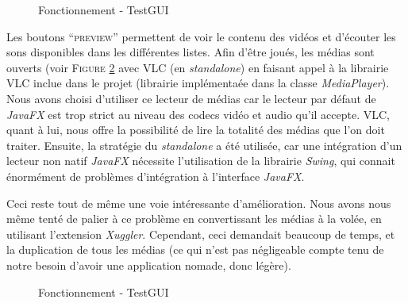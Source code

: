 \begin{figure}[!ht]
\begin{center}
  \caption{Fonctionnement - TestGUI}
  \label{TestGUI}
\end{center}
\end{figure}

Les boutons ``\textsc{preview}'' permettent de voir le contenu des vidéos et d'écouter les sons disponibles dans les différentes listes. Afin d'être joués, les médias sont ouverts (voir \textsc{Figure} \ref{VLC} avec VLC (en \textit{standalone}) en faisant appel à la librairie VLC inclue dans le projet (librairie implémentaée dans la classe \textit{MediaPlayer}). Nous avons choisi d'utiliser ce lecteur de médias car le lecteur par défaut de \textit{JavaFX} est trop strict au niveau des codecs vidéo et audio qu'il accepte. VLC, quant à lui, nous offre la possibilité de lire la totalité des médias que l'on doit traiter. Ensuite, la stratégie du \textit{standalone} a été utilisée, car une intégration d'un lecteur non natif \textit{JavaFX} nécessite l'utilisation de la librairie \textit{Swing}, qui connait énormément de problèmes d'intégration à l'interface \textit{JavaFX}.

Ceci reste tout de même une voie intéressante d'amélioration. Nous avons nous même tenté de palier à ce problème en convertissant les médias à la volée, en utilisant l'extension \textit{Xuggler}. Cependant, ceci demandait beaucoup de temps, et la duplication de tous les médias (ce qui n'est pas négligeable compte tenu de notre besoin d'avoir une application nomade, donc légère).

\begin{figure}[!ht]
\begin{center}
  \caption{Fonctionnement - TestGUI}
  \label{VLC} 
\end{center}
\end{figure}


